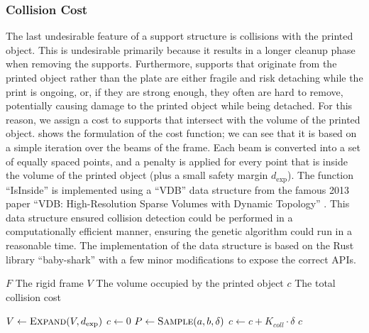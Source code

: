 \subsubsection{Collision Cost}

The last undesirable feature of a support structure is collisions with the printed object.
This is undesirable primarily because it results in a longer cleanup phase when removing
the supports. Furthermore, supports that originate from the printed object rather than the plate
are either fragile and risk detaching while the print is ongoing, or, if they are
strong enough, they often are hard to remove, potentially causing damage to the printed object
while being detached.
For this reason, we assign a cost to supports that intersect with the volume
of the printed object.  shows the formulation of the cost function;
we can see that it is based on a simple iteration over the beams of the frame.
Each beam is converted into a set of equally spaced points, and a penalty is applied
for every point that is inside the volume of the printed object (plus a small safety
margin $d_{\text{exp}}$).
The function ``IsInside'' is implemented using a ``VDB'' data structure 
from the famous 2013 paper ``VDB: High-Resolution Sparse Volumes with Dynamic Topology''
\cite{openvdb}. This data structure ensured collision detection could be performed in a computationally
efficient manner, ensuring the genetic algorithm could run in a reasonable time.
The implementation of the data structure is based on the Rust library ``baby-shark'' \cite{babyshark}
with a few minor modifications to expose the correct APIs.


\begin{algorithm}[ht]
\caption{Support Structure Collision Cost}
\begin{algorithmic}[1]
    \Require $F$ The rigid frame
    \Require $V$ The volume occupied by the printed object
    \Ensure $c$ The total collision cost

        \State $V \gets \Call{Expand}{V, d_{\text{exp}}}$ 
        \State $c \gets 0$
         
            \State $P \gets \Call{Sample}{a, b, \delta}$ 
                 
                    \State $c \gets c + K_{coll} \cdot \delta$
                \EndIf
            \EndFor
        \EndFor
        \State \Return $c$
    \EndProcedure
\end{algorithmic}
\label{alg:collision_cost}
\end{algorithm}

